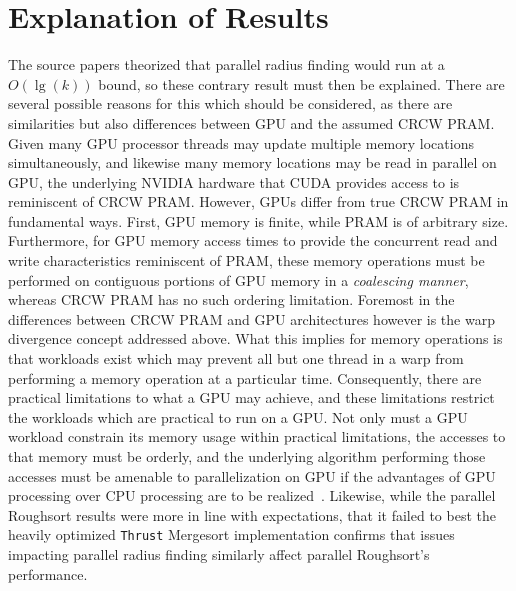 \documentclass[letterpaper, 12pt]{article}
\let\supercite\cite
\renewcommand{\cite}[1]{\textnormal{~\supercite{#1}}}
\begin{document}
\clearpage
\section{Explanation of Results}
  The source papers theorized that parallel radius finding would run at a $O(\lg(k))$ bound, so these contrary result must then be explained.  
  There are several possible reasons for this which should be considered, as there are similarities but also differences between GPU and the 
  assumed CRCW PRAM.
    Given many GPU processor threads may update multiple memory locations simultaneously, and likewise many memory locations may be read in 
  parallel on GPU, the underlying NVIDIA hardware that CUDA provides access to is reminiscent of CRCW PRAM.  However, GPUs differ from true
  CRCW PRAM in fundamental ways.  First, GPU memory is finite, while PRAM is of arbitrary size.  Furthermore, for GPU memory access times to
  provide the concurrent read and write characteristics reminiscent of PRAM, these memory operations must be performed on contiguous portions
  of GPU memory in a \textit{coalescing manner}, whereas CRCW PRAM has no such ordering limitation.  Foremost in the differences between CRCW
  PRAM and GPU architectures however is the warp divergence concept addressed above.  What this implies for memory operations is that workloads
  exist which may prevent all but one thread in a warp from performing a memory operation at a particular time.  Consequently, there are
  practical limitations to what a GPU may achieve, and these limitations restrict the workloads which are practical to run on a GPU.  Not 
  only must a GPU workload constrain its memory usage within practical limitations, the accesses to that memory must be orderly, and the 
  underlying algorithm performing those accesses must be amenable to parallelization on GPU if the advantages of GPU processing over CPU 
  processing are to be realized\cite{dehne2010exploring}.
  Likewise, while the parallel Roughsort results were more in line with expectations, that it failed to best the heavily optimized \texttt{Thrust}
  Mergesort implementation confirms that issues impacting parallel radius finding similarly affect parallel Roughsort's performance.
\end{document}
